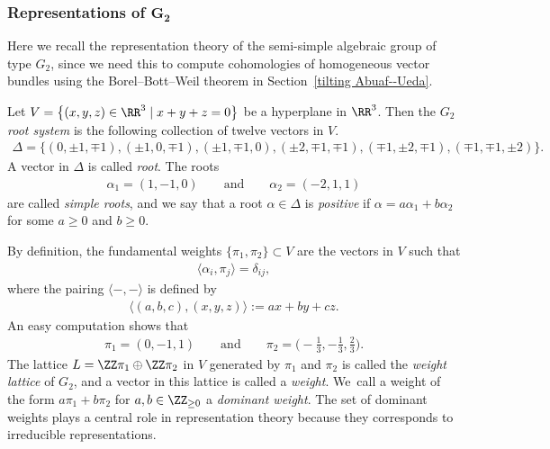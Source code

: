 \subsubsection[Representations of G2]
{Representations of $\boldsymbol{G_2}$}
Here we recall the representation theory of the semi-simple algebraic group of type $G_2$,
since we need this to compute cohomologies of homogeneous vector bundles using the Borel--Bott--Weil theorem
in Section~\ref{tilting Abuaf--Ueda}.

Let $V = \big\{ (x,y,z) \in \RR^3 \mid x + y + z = 0 \big\}$ be a hyperplane in $\RR^3$.
Then the $G_2$ \textit{root system} is the following collection of twelve vectors in $V$.
\begin{gather*}
\Delta = \{ (0, \pm 1, \mp 1), (\pm 1, 0 , \mp 1), (\pm 1, \mp 1, 0), (\pm 2, \mp 1, \mp 1), (\mp 1, \pm 2, \mp 1), (\mp 1, \mp 1, \pm 2) \}.
\end{gather*}
A vector in $\Delta$ is called \textit{root}.
The roots
\begin{gather*}
\alpha_1 = (1, -1, 0)\qquad \text{and}\qquad \alpha_2 = (-2, 1, 1)
\end{gather*}
are called \textit{simple roots},
and we say that a root $\alpha \in \Delta$ is \textit{positive} if $\alpha = a \alpha_1 + b \alpha_2$ for some $a \geq 0$ and $b \geq 0$.

By definition, the fundamental weights $\{\pi_1, \pi_2 \} \subset V$ are the vectors in $V$ such that
\begin{gather*}
\langle \alpha_i, \pi_j \rangle = \delta_{ij},
\end{gather*}
where the pairing $\langle -, - \rangle$ is defined by
\begin{gather*}
\langle (a,b,c), (x,y,z) \rangle := ax + by + cz.
\end{gather*}
An easy computation shows that
\begin{gather*}
\pi_1 = (0, -1, 1)\qquad \text{and}\qquad \pi_2 = \bigg(\!{-}\frac{1}{3},-\frac{1}{3}, \frac{2}{3}\bigg).
\end{gather*}
The lattice $L = \ZZ \pi_1 \oplus \ZZ \pi_2$ in $V$ generated by $\pi_1$ and $\pi_2$ is called the \textit{weight lattice} of $G_2$,
and a vector in this lattice is called a \textit{weight}.
We~call a weight of the form $a \pi_1 + b \pi_2$ for $a, b \in \ZZ_{\geq 0}$ a \textit{dominant weight}.
The set of dominant weights plays a central role in representation theory because they corresponds to irreducible representations.

